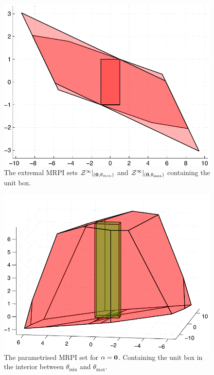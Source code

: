 \documentclass[letterpaper, 10pt, conference]{ieeeconf} %
\begin{document}
\begin{figure}
\includegraphics[width=\columnwidth]{twoDimensional}
\caption{The extremal MRPI sets $\mathcal Z^\infty\vert_{({\bf{0}},\theta_{min})}$ and $\mathcal Z^\infty
\vert_{({\bf{0}},\theta_{\max})}$ containing the unit box.}
\label{fig:two:dim:example}
\end{figure}
\begin{figure}
\includegraphics[width=\columnwidth]{threeDimensional}
\caption{The parametrised MRPI set for $\alpha={\bf{0}}$. Containing the unit box in the 
interior between $\theta_{\min}$ and $\theta_{\max}$.}
\label{fig:three:dim:example}
\end{figure}
%
%
%
\end{document}

